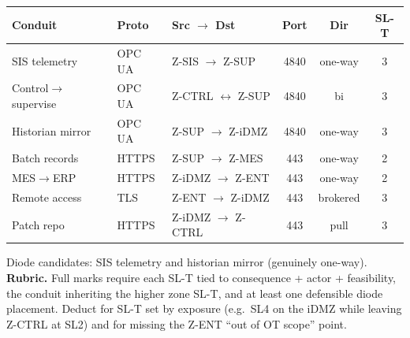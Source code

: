 \documentclass[11pt,a4paper]{article}
\begin{document}
\begin{solutionbox}
\renewcommand{\arraystretch}{1.15}
\footnotesize
\par\begin{tabular}{|p{2.9cm}|p{1.4cm}|p{2.6cm}|c|c|c|}
\hline
\textbf{Conduit} & \textbf{Proto} & \textbf{Src $\to$ Dst} & \textbf{Port} & \textbf{Dir} & \textbf{SL-T} \\
\hline
SIS telemetry & OPC UA & Z-SIS $\to$ Z-SUP & 4840 & one-way & 3 \\
Control$\to$supervise & OPC UA & Z-CTRL $\leftrightarrow$ Z-SUP & 4840 & bi & 3 \\
Historian mirror & OPC UA & Z-SUP $\to$ Z-iDMZ & 4840 & one-way & 3 \\
Batch records & HTTPS & Z-SUP $\to$ Z-MES & 443 & one-way & 2 \\
MES$\to$ERP & HTTPS & Z-iDMZ $\to$ Z-ENT & 443 & one-way & 2 \\
Remote access & TLS & Z-ENT $\to$ Z-iDMZ & 443 & brokered & 3 \\
Patch repo & HTTPS & Z-iDMZ $\to$ Z-CTRL & 443 & pull & 3 \\
\hline
\end{tabular}

\par\vspace{2mm}
\noindent Diode candidates: SIS telemetry and historian mirror (genuinely one-way). \textbf{Rubric.} Full marks require each SL-T tied to consequence + actor + feasibility, the conduit inheriting the higher zone SL-T, and at least one defensible diode placement. Deduct for SL-T set by exposure (e.g.\ SL4 on the iDMZ while leaving Z-CTRL at SL2) and for missing the Z-ENT ``out of OT scope'' point.
\end{solutionbox}
\end{document}
